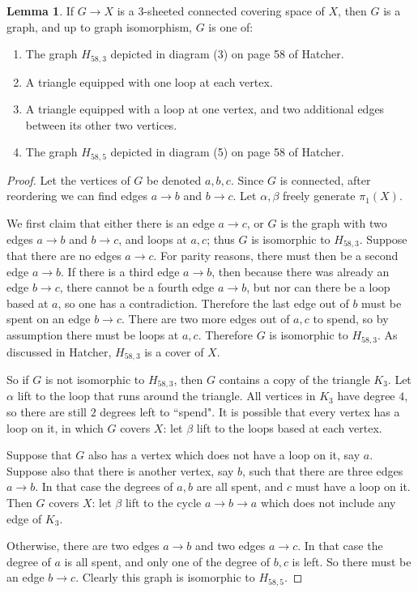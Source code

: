 \documentclass[10pt]{article}
\theoremstyle{definition}
\newtheorem{lemma}{Lemma}[exer]
\begin{document}
\begin{lemma}
If $G \to X$ is a $3$-sheeted connected covering space of $X$, then $G$ is a graph, and up to graph isomorphism, $G$ is one of:
\begin{enumerate}
\item The graph $H_{58,3}$ depicted in diagram (3) on page 58 of Hatcher.
\item A triangle equipped with one loop at each vertex.
\item A triangle equipped with a loop at one vertex, and two additional edges between its other two vertices.
\item The graph $H_{58,5}$ depicted in diagram (5) on page 58 of Hatcher.
\end{enumerate}
\end{lemma}
\begin{proof}
Let the vertices of $G$ be denoted $a,b,c$.
Since $G$ is connected, after reordering we can find edges $ a \to b$ and $ b \to c$.
Let $\alpha,\beta$ freely generate $\pi_1(X)$.

We first claim that either there is an edge $a \to c$, or $G$ is the graph with two edges $a \to b$ and $b \to c$, and loops at $a, c$; thus $G$ is isomorphic to $H_{58,3}$.
Suppose that there are no edges $a \to c$.
For parity reasons, there must then be a second edge $a \to b$.
If there is a third edge $a \to b$, then because there was already an edge $b \to c$, there cannot be a fourth edge $a \to b$, but nor can there be a loop based at $a$, so one has a contradiction.
Therefore the last edge out of $b$ must be spent on an edge $b \to c$.
There are two more edges out of $a,c$ to spend, so by assumption there must be loops at $a,c$.
Therefore $G$ is isomorphic to $H_{58,3}$.
As discussed in Hatcher, $H_{58,3}$ is a cover of $X$.

So if $G$ is not isomorphic to $H_{58,3}$, then $G$ contains a copy of the triangle $K_3$.
Let $\alpha$ lift to the loop that runs around the triangle.
All vertices in $K_3$ have degree $4$, so there are still $2$ degrees left to ``spend".
It is possible that every vertex has a loop on it, in which $G$ covers $X$: let $\beta$ lift to the loops based at each vertex.

Suppose that $G$ also has a vertex which does not have a loop on it, say $a$.
Suppose also that there is another vertex, say $b$, such that there are three edges $a \to b$.
In that case the degrees of $a,b$ are all spent, and $c$ must have a loop on it.
Then $G$ covers $X$: let $\beta$ lift to the cycle $a \to b \to a$ which does not include any edge of  $K_3$.

Otherwise, there are two edges $a \to b$ and two edges $a \to c$.
In that case the degree of $a$ is all spent, and only one of the degree of $b,c$ is left.
So there must be an edge $b \to c$. Clearly this graph is isomorphic to $H_{58,5}$.
\end{proof}
\end{document}
